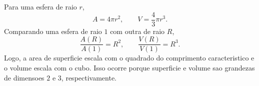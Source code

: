 Para uma esfera de raio $r$,
\[
A = 4\pi r^2, \qquad V = \frac{4}{3}\pi r^3.
\]
Comparando uma esfera de raio $1$ com outra de raio $R$,
\[
\frac{A(R)}{A(1)} = R^2, \qquad \frac{V(R)}{V(1)} = R^3.
\]
Logo, a area de superficie escala com o quadrado do comprimento caracteristico e o volume escala com o cubo. Isso ocorre porque superficie e volume sao grandezas de dimensoes $2$ e $3$, respectivamente.

